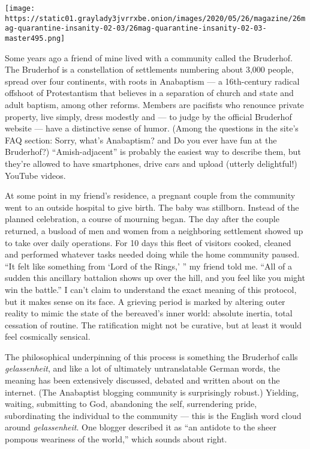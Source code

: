 \texttt{[image: https://static01.graylady3jvrrxbe.onion/images/2020/05/26/magazine/26mag-quarantine-insanity-02-03/26mag-quarantine-insanity-02-03-master495.png]}

Some years ago a friend of mine lived with a community called the
Bruderhof. The Bruderhof is a constellation of settlements numbering
about 3,000 people, spread over four continents, with roots in
Anabaptism --- a 16th-century radical offshoot of Protestantism that
believes in a separation of church and state and adult baptism, among
other reforms. Members are pacifists who renounce private property, live
simply, dress modestly and --- to judge by the official Bruderhof
website --- have a distinctive sense of humor. (Among the questions in
the site's FAQ section: Sorry, what's Anabaptism? and Do you ever have
fun at the Bruderhof?) ``Amish-adjacent'' is probably the easiest way to
describe them, but they're allowed to have smartphones, drive cars and
upload (utterly delightful!) YouTube videos.

At some point in my friend's residence, a pregnant couple from the
community went to an outside hospital to give birth. The baby was
stillborn. Instead of the planned celebration, a course of mourning
began. The day after the couple returned, a busload of men and women
from a neighboring settlement showed up to take over daily operations.
For 10 days this fleet of visitors cooked, cleaned and performed
whatever tasks needed doing while the home community paused. ``It felt
like something from `Lord of the Rings,' '' my friend told me. ``All of
a sudden this ancillary battalion shows up over the hill, and you feel
like you might win the battle.'' I can't claim to understand the exact
meaning of this protocol, but it makes sense on its face. A grieving
period is marked by altering outer reality to mimic the state of the
bereaved's inner world: absolute inertia, total cessation of routine.
The ratification might not be curative, but at least it would feel
cosmically sensical.

The philosophical underpinning of this process is something the
Bruderhof calls \emph{gelassenheit}, and like a lot of ultimately
untranslatable German words, the meaning has been extensively discussed,
debated and written about on the internet. (The Anabaptist blogging
community is surprisingly robust.) Yielding, waiting, submitting to God,
abandoning the self, surrendering pride, subordinating the individual to
the community --- this is the English word cloud around
\emph{gelassenheit}. One blogger described it as ``an antidote to the
sheer pompous weariness of the world,'' which sounds about right.

